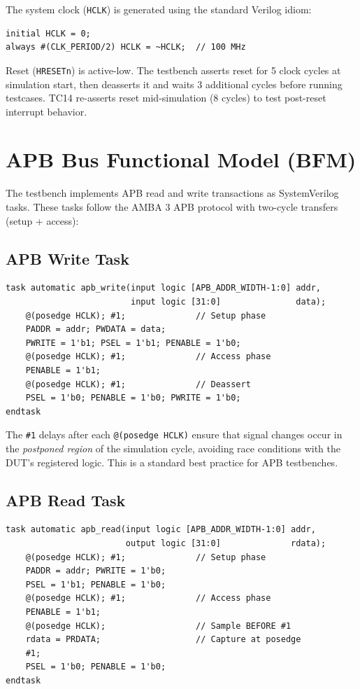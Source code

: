 The system clock (\texttt{HCLK}) is generated using the standard Verilog idiom:
\begin{lstlisting}
initial HCLK = 0;
always #(CLK_PERIOD/2) HCLK = ~HCLK;  // 100 MHz
\end{lstlisting}

Reset (\texttt{HRESETn}) is active-low. The testbench asserts reset for 5 clock cycles at
simulation start, then deasserts it and waits 3 additional cycles before running testcases.
TC14 re-asserts reset mid-simulation (8 cycles) to test post-reset interrupt behavior.

\section{APB Bus Functional Model (BFM)}
\label{sec:apb_bfm}

The testbench implements APB read and write transactions as SystemVerilog tasks. These tasks
follow the AMBA 3 APB protocol with two-cycle transfers (setup + access):

\subsection{APB Write Task}

\begin{lstlisting}
task automatic apb_write(input logic [APB_ADDR_WIDTH-1:0] addr,
                         input logic [31:0]               data);
    @(posedge HCLK); #1;              // Setup phase
    PADDR = addr; PWDATA = data;
    PWRITE = 1'b1; PSEL = 1'b1; PENABLE = 1'b0;
    @(posedge HCLK); #1;              // Access phase
    PENABLE = 1'b1;
    @(posedge HCLK); #1;              // Deassert
    PSEL = 1'b0; PENABLE = 1'b0; PWRITE = 1'b0;
endtask
\end{lstlisting}

The \texttt{\#1} delays after each \texttt{@(posedge HCLK)} ensure that signal changes occur in
the \emph{postponed region} of the simulation cycle, avoiding race conditions with the DUT's
registered logic. This is a standard best practice for APB testbenches.

\subsection{APB Read Task}

\begin{lstlisting}
task automatic apb_read(input logic [APB_ADDR_WIDTH-1:0] addr,
                        output logic [31:0]              rdata);
    @(posedge HCLK); #1;              // Setup phase
    PADDR = addr; PWRITE = 1'b0;
    PSEL = 1'b1; PENABLE = 1'b0;
    @(posedge HCLK); #1;              // Access phase
    PENABLE = 1'b1;
    @(posedge HCLK);                  // Sample BEFORE #1
    rdata = PRDATA;                   // Capture at posedge
    #1;
    PSEL = 1'b0; PENABLE = 1'b0;
endtask
\end{lstlisting}

